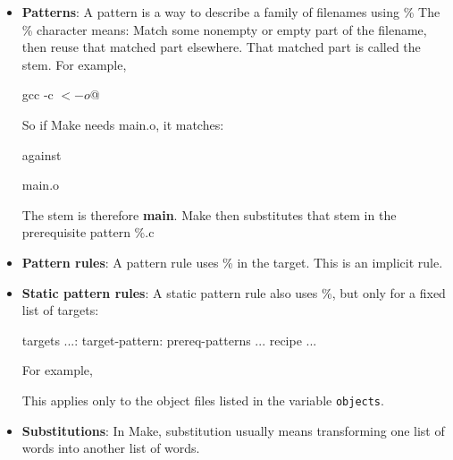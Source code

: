 \documentclass{report}
\begin{document}
    \pagebreak 
    \begin{itemize}
        \item \textbf{Patterns}: A pattern is a way to describe a family of filenames using \%
            \bigbreak \noindent 
            The \% character means: Match some nonempty or empty part of the filename, then reuse that matched part elsewhere.
            \bigbreak \noindent 
            That matched part is called the stem.
            \bigbreak \noindent 
            For example,
            \bigbreak \noindent 
            \begin{bashcode}
                gcc -c $< -o $@
            \end{bashcode}
            \bigbreak \noindent 
            So if Make needs main.o, it matches:
            \bigbreak \noindent 
            \begin{bashcode}
            \end{bashcode}
            \bigbreak \noindent 
            against 
            \bigbreak \noindent 
            \begin{bashcode}
            main.o
            \end{bashcode}
            \bigbreak \noindent 
            The stem is therefore \textbf{main}. Make then substitutes that stem in the prerequisite pattern \%.c
        \item \textbf{Pattern rules}: A pattern rule uses \% in the target. This is an implicit rule.
        \item \textbf{Static pattern rules}: A static pattern rule also uses \%, but only for a fixed list of targets:
            \bigbreak \noindent 
            \begin{bashcode}
                targets ...: target-pattern: prereq-patterns ...
                    recipe
                    ...
            \end{bashcode}
            \bigbreak \noindent 
            For example, 
            \bigbreak \noindent 
            This applies only to the object files listed in the variable \texttt{objects}.
        \item \textbf{Substitutions}: In Make, substitution usually means transforming one list of words into another list of words.

\end{itemize}
\end{document}
